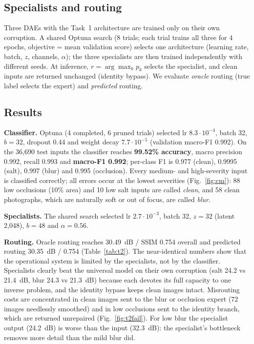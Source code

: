 \documentclass[conference]{IEEEtran}
\begin{document}
\subsection{Specialists and routing}
Three DAEs with the Task~1 architecture are trained only on their own corruption. A shared Optuna search (8 trials; each trial trains all three for 4 epochs, objective = mean validation score) selects one architecture (learning rate, batch, $z$, channels, $\alpha$); the three specialists are then trained independently with different seeds. At inference, $r=\arg\max_k p_k$ selects the specialist, and clean inputs are returned unchanged (identity bypass). We evaluate \emph{oracle} routing (true label selects the expert) and \emph{predicted} routing.

\subsection{Results}
\textbf{Classifier.} Optuna (4 completed, 6 pruned trials) selected lr $8.3\cdot10^{-4}$, batch 32, $b=32$, dropout 0.44 and weight decay $7.7\cdot10^{-5}$ (validation macro-F1 0.992). On the 36{,}690 test inputs the classifier reaches \textbf{99.52\% accuracy}, macro precision 0.992, recall 0.993 and \textbf{macro-F1 0.992}; per-class F1 is 0.977 (clean), 0.9995 (salt), 0.997 (blur) and 0.995 (occlusion). Every medium- and high-severity input is classified correctly; all errors occur at the lowest severities (Fig.~\ref{fig:cm}): 88 low occlusions (10\% area) and 10 low salt inputs are called \emph{clean}, and 58 clean photographs, which are naturally soft or out of focus, are called \emph{blur}.

\textbf{Specialists.} The shared search selected lr $2.7\cdot10^{-3}$, batch 32, $z=32$ (latent 2{,}048), $b=48$ and $\alpha=0.56$.

\textbf{Routing.} Oracle routing reaches 30.49~dB / SSIM 0.754 overall and predicted routing 30.35~dB / 0.754 (Table~\ref{tab:t2}). The near-identical numbers show that the operational system is limited by the specialists, not by the classifier. Specialists clearly beat the universal model on their own corruption (salt 24.2 vs 21.4~dB, blur 24.3 vs 21.3~dB) because each devotes its full capacity to one inverse problem, and the identity bypass keeps clean images intact. Misrouting costs are concentrated in clean images sent to the blur or occlusion expert (72 images needlessly smoothed) and in low occlusions sent to the identity branch, which are returned unrepaired (Fig.~\ref{fig:t2fail}). For low blur the specialist output (24.2~dB) is worse than the input (32.3~dB): the specialist's bottleneck removes more detail than the mild blur did.
\end{document}
